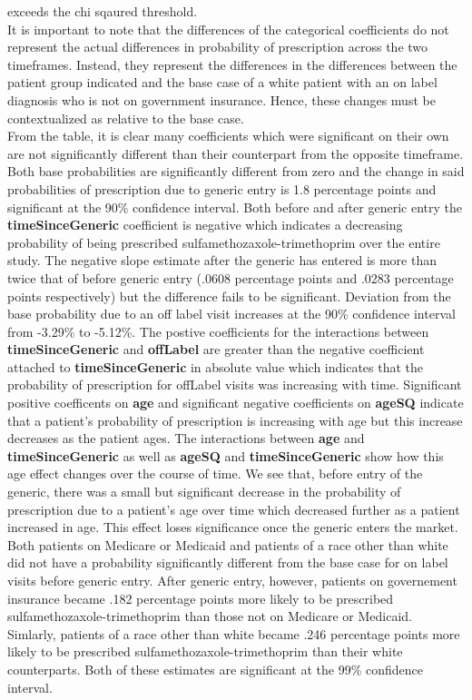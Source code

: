 exceeds the chi sqaured threshold.\\
\indent It is important to note that the differences of the categorical coefficients do not represent the actual differences in probability of prescription across the two timeframes. Instead, they represent the differences in the differences between the patient group indicated and the base case of a white patient with an on label diagnosis who is not on government insurance. Hence, these changes must be contextualized as relative to the base case.\\
\indent From the table, it is clear many coefficients which were significant on their own are not significantly different than their counterpart from the opposite timeframe. Both base probabilities are significantly different from zero and the change in said probabilities of prescription due to generic entry is 1.8 percentage points and significant at the 90\% confidence interval. Both before and after generic entry the \textbf{timeSinceGeneric} coefficient is negative which indicates a decreasing probability of being prescribed sulfamethozaxole-trimethoprim over the entire study. The negative slope estimate after the generic has entered is more than twice that of before generic entry (.0608 percentage points and .0283 percentage points respectively) but the difference fails to be significant. Deviation from the base probability due to an off label visit increases at the 90\% confidence interval from -3.29\% to -5.12\%. The postive coefficients for the interactions between \textbf{timeSinceGeneric} and \textbf{offLabel} are greater than the negative coefficient attached to \textbf{timeSinceGeneric} in absolute value which indicates that the probability of prescription for offLabel visits was increasing with time. Significant positive coefficents on \textbf{age} and significant negative coefficients on \textbf{ageSQ} indicate that a patient's probability of prescription is increasing with age but this increase decreases as the patient ages. The interactions between \textbf{age} and \textbf{timeSinceGeneric} as well as \textbf{ageSQ} and \textbf{timeSinceGeneric} show how this age effect changes over the course of time. We see that, before entry of the generic, there was a small but significant decrease in the probability of prescription due to a patient's age over time which decreased further as a patient increased in age. This effect loses significance once the generic enters the market.\\
\indent Both patients on Medicare or Medicaid and patients of a race other than white did not have a probability significantly different from the base case for on label visits before generic entry. After generic entry, however, patients on governement insurance became .182 percentage points more likely to be prescribed sulfamethozaxole-trimethoprim than those not on Medicare or Medicaid. Simlarly, patients of a race other than white became .246 percentage points more likely to be prescribed sulfamethozaxole-trimethoprim than their white counterparts. Both of these estimates are significant at the 99\% confidence interval. 


